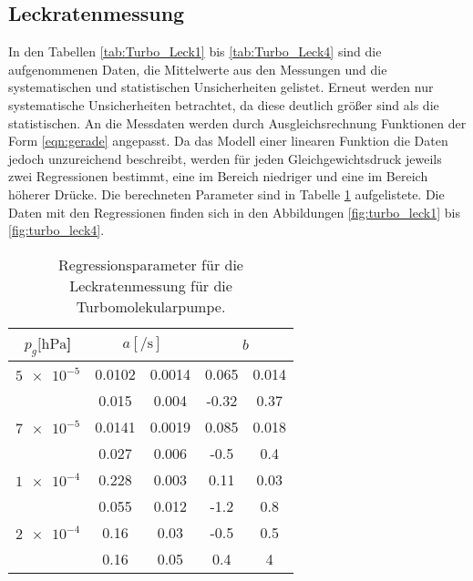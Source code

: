 \subsection{Leckratenmessung}
In den Tabellen \ref{tab:Turbo_Leck1} bis \ref{tab:Turbo_Leck4} sind die aufgenommenen Daten, die 
Mittelwerte aus den Messungen und die systematischen und statistischen Unsicherheiten gelistet.
Erneut werden nur systematische Unsicherheiten betrachtet, da diese deutlich größer sind als die 
statistischen. 
An die Messdaten werden durch Ausgleichsrechnung Funktionen der Form \ref{eqn:gerade} angepasst.
Da das Modell einer linearen Funktion die Daten jedoch unzureichend beschreibt, werden 
für jeden Gleichgewichtsdruck jeweils zwei Regressionen bestimmt, eine im Bereich niedriger 
und eine im Bereich höherer Drücke. Die berechneten Parameter sind in Tabelle \ref{tab:Turbo_Leck_para}
aufgelistete. Die Daten mit den Regressionen finden sich in den Abbildungen \ref{fig:turbo_leck1} 
bis \ref{fig:turbo_leck4}.
\begin{table}[H]
    \centering
      \caption{Regressionsparameter für die Leckratenmessung für die Turbomolekularpumpe.}
      \label{tab:Turbo_Leck_para}
      \begin{tabular}{c c @{${}\pm{}$} c c @{${}\pm{}$} c}
        \toprule
        {$p_g [\si{\hecto\pascal}$]} & \multicolumn{2}{c}{$a [\si{\per\second}]$} & \multicolumn{2}{c}{$b$} \\
        \midrule
        $\num{5e-5}$  & 0.0102 & 0.0014 & 0.065 & 0.014\\
                      & 0.015  & 0.004  & -0.32 & 0.37 \\
        \midrule
        $\num{7e-5}$  & 0.0141 & 0.0019 & 0.085 & 0.018\\
                      & 0.027  & 0.006  & -0.5  & 0.4  \\
        \midrule
        $\num{1e-4}$  & 0.228  & 0.003  & 0.11  & 0.03 \\
                      & 0.055  & 0.012  & -1.2  & 0.8  \\
        \midrule
        $\num{2e-4}$  & 0.16   & 0.03   & -0.5  & 0.5  \\
                      & 0.16   & 0.05   & 0.4   & 4    \\
        \bottomrule
      \end{tabular}
\end{table}
